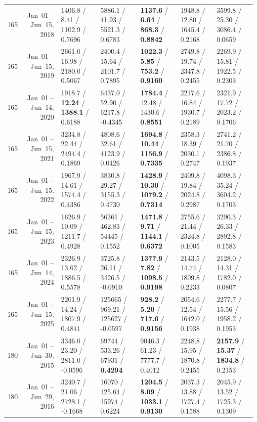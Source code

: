 \begin{longtable}{r r l l l l l}
165 & Jan~01 -- Jun~15, 2018 & 1406.8 / 8.41 / 1102.9 / 0.7696 & 5886.1 / 41.93 / 5521.3 / 0.6783 & \textbf{1137.6} / \textbf{6.64} / \textbf{868.3} / \textbf{0.8842} & 1948.8 / 12.80 / 1645.4 / 0.2168 & 3599.8 / 25.30 / 3086.4 / 0.0659 \\
165 & Jan~01 -- Jun~15, 2019 & 2661.0 / 16.98 / 2180.0 / 0.5067 & 2400.4 / 15.64 / 2101.7 / 0.7895 & \textbf{1022.3} / \textbf{5.85} / \textbf{753.2} / \textbf{0.9160} & 2749.8 / 19.74 / 2347.8 / 0.2455 & 2269.9 / 15.81 / 1922.5 / 0.2303 \\
165 & Jan~01 -- Jun~14, 2020 & 1918.7 / \textbf{12.24} / \textbf{1388.1} / 0.6188 & 6437.0 / 52.90 / 6217.8 / -0.4345 & \textbf{1784.4} / 12.48 / 1430.6 / \textbf{0.8551} & 2217.6 / 16.84 / 1930.7 / 0.2189 & 2321.9 / 17.72 / 2023.2 / 0.1706 \\
165 & Jan~01 -- Jun~15, 2021 & 3234.8 / 22.44 / 2494.4 / 0.1869 & 4808.6 / 32.61 / 4123.9 / 0.0426 & \textbf{1694.8} / \textbf{10.44} / \textbf{1156.9} / \textbf{0.7335} & 2358.3 / 18.39 / 2030.1 / 0.2747 & 2741.2 / 21.70 / 2386.8 / 0.1937 \\
165 & Jan~01 -- Jun~15, 2022 & 1967.9 / 14.61 / 1574.4 / 0.4386 & 3830.8 / 29.27 / 3155.3 / 0.4730 & \textbf{1428.9} / \textbf{10.30} / \textbf{1079.2} / \textbf{0.7314} & 2409.8 / 19.84 / 2024.8 / 0.2987 & 4098.3 / 35.24 / 3604.2 / 0.1703 \\
165 & Jan~01 -- Jun~15, 2023 & 1626.9 / 10.09 / 1211.7 / 0.4928 & 56361 / 462.83 / 54445 / 0.1552 & \textbf{1471.8} / \textbf{9.71} / \textbf{1144.1} / \textbf{0.6372} & 2755.6 / 21.44 / 2324.8 / 0.1005 & 3290.3 / 26.33 / 2892.8 / 0.1583 \\
165 & Jan~01 -- Jun~14, 2024 & 2326.9 / 13.62 / 1886.5 / 0.5578 & 3725.8 / 26.11 / 3426.5 / -0.0910 & \textbf{1377.9} / \textbf{7.82} / \textbf{1098.5} / \textbf{0.9198} & 2143.5 / 14.74 / 1809.8 / 0.2233 & 2128.0 / 14.31 / 1782.0 / 0.0807 \\
165 & Jan~01 -- Jun~15, 2025 & 2201.9 / 14.24 / 1807.9 / 0.4841 & 125665 / 969.21 / 125627 / -0.0597 & \textbf{928.2} / \textbf{5.20} / \textbf{717.6} / \textbf{0.9156} & 2054.6 / 12.54 / 1642.0 / 0.1938 & 2277.7 / 15.56 / 1958.2 / 0.1953 \\
\midrule
180 & Jan~01 -- Jun~30, 2015 & 3346.0 / 23.20 / 2811.0 / -0.0596 & 69744 / 533.26 / 67931 / \textbf{0.4294} & 9046.3 / 61.23 / 7777.7 / 0.4012 & 2248.8 / 15.95 / 1870.8 / 0.2455 & \textbf{2157.9} / \textbf{15.37} / \textbf{1834.8} / 0.2153 \\
180 & Jan~01 -- Jun~29, 2016 & 3240.7 / 21.06 / 2728.1 / -0.1668 & 16070 / 125.64 / 15974 / 0.6224 & \textbf{1204.5} / \textbf{8.09} / \textbf{1033.1} / \textbf{0.9130} & 2037.3 / 13.88 / 1727.4 / 0.1588 & 2045.9 / 13.52 / 1725.3 / 0.1309 \\

\end{longtable}
